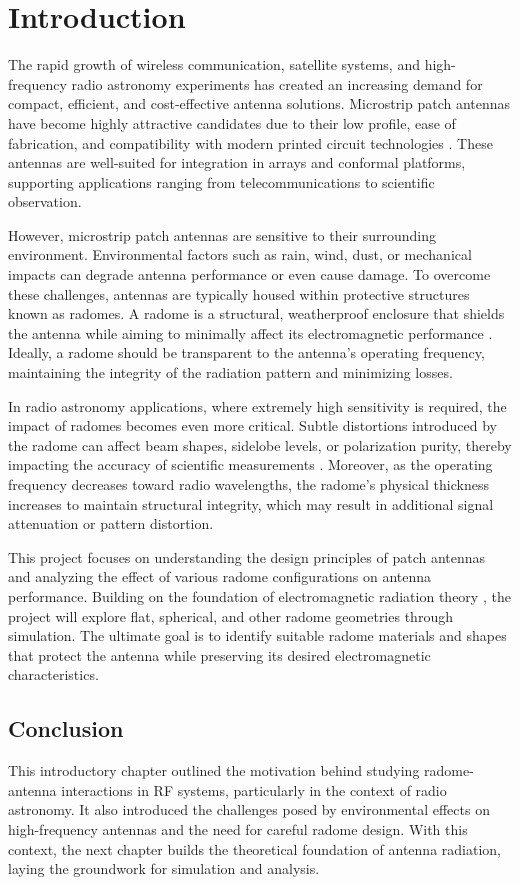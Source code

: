 \chapter{Introduction}

The rapid growth of wireless communication, satellite systems, and high-frequency radio astronomy experiments has created an increasing demand for compact, efficient, and cost-effective antenna solutions. Microstrip patch antennas have become highly attractive candidates due to their low profile, ease of fabrication, and compatibility with modern printed circuit technologies \cite{werfelli2016patch,balanis}. These antennas are well-suited for integration in arrays and conformal platforms, supporting applications ranging from telecommunications to scientific observation.

However, microstrip patch antennas are sensitive to their surrounding environment. Environmental factors such as rain, wind, dust, or mechanical impacts can degrade antenna performance or even cause damage. To overcome these challenges, antennas are typically housed within protective structures known as radomes. A radome is a structural, weatherproof enclosure that shields the antenna while aiming to minimally affect its electromagnetic performance \cite{swra705,aemterms}. Ideally, a radome should be transparent to the antenna’s operating frequency, maintaining the integrity of the radiation pattern and minimizing losses.

In radio astronomy applications, where extremely high sensitivity is required, the impact of radomes becomes even more critical. Subtle distortions introduced by the radome can affect beam shapes, sidelobe levels, or polarization purity, thereby impacting the accuracy of scientific measurements \cite{mcculloch2023sband}. Moreover, as the operating frequency decreases toward radio wavelengths, the radome’s physical thickness increases to maintain structural integrity, which may result in additional signal attenuation or pattern distortion.

This project focuses on understanding the design principles of patch antennas and analyzing the effect of various radome configurations on antenna performance. Building on the foundation of electromagnetic radiation theory \cite{balanis}, the project will explore flat, spherical, and other radome geometries through simulation. The ultimate goal is to identify suitable radome materials and shapes that protect the antenna while preserving its desired electromagnetic characteristics.

\section*{Conclusion}

This introductory chapter outlined the motivation behind studying radome-antenna interactions in RF systems, particularly in the context of radio astronomy. It also introduced the challenges posed by environmental effects on high-frequency antennas and the need for careful radome design. With this context, the next chapter builds the theoretical foundation of antenna radiation, laying the groundwork for simulation and analysis.

